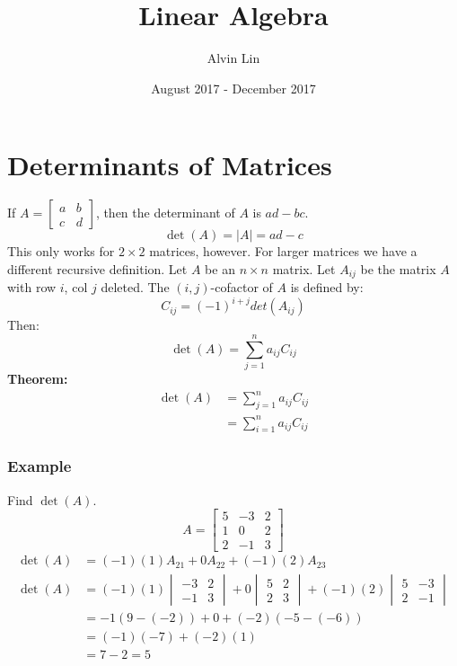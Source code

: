 \documentclass{math}
\title{Linear Algebra}
\author{Alvin Lin}
\date{August 2017 - December 2017}
\begin{document}
\maketitle

\section*{Determinants of Matrices}
If \( A = \begin{bmatrix}a & b \\ c & d\end{bmatrix} \), then the determinant
of \( A \) is \( ad-bc \).
\[ \det(A) = |A| = ad-c \]
This only works for \( 2\times2 \) matrices, however. For larger matrices we
have a different recursive definition. Let \( A \) be an \( n\times n \)
matrix. Let \( A_{ij} \) be the matrix \( A \) with row \( i \), col \( j \)
deleted. The \( (i,j) \)-cofactor of \( A \) is defined by:
\[ C_{ij} = (-1)^{i+j}det(A_{ij}) \]
Then:
\[ \det(A) = \sum_{j=1}^{n}a_{ij}C_{ij} \]
\textbf{Theorem:}
\begin{align*}
  \det(A) &= \sum_{j=1}^{n}a_{ij}C_{ij} \\
  &= \sum_{i=1}^{n}a_{ij}C_{ij}
\end{align*}

\subsubsection*{Example}
Find \( \det(A) \).
\[ A = \begin{bmatrix}5 & -3 & 2 \\ 1 & 0 & 2 \\ 2 & -1 & 3\end{bmatrix} \]
\begin{align*}
  \det(A) &= (-1)(1)A_{21}+0A_{22}+(-1)(2)A_{23} \\
  \det(A) &= (-1)(1)\begin{vmatrix}-3 & 2 \\ -1 & 3\end{vmatrix}+
    0\begin{vmatrix}5 & 2 \\ 2 & 3\end{vmatrix}+
    (-1)(2)\begin{vmatrix}5 & -3 \\ 2 & -1\end{vmatrix} \\
  &= -1(9-(-2))+0+(-2)(-5-(-6)) \\
  &= (-1)(-7)+(-2)(1) \\
  &= 7-2 = 5
\end{align*}
\end{document}
